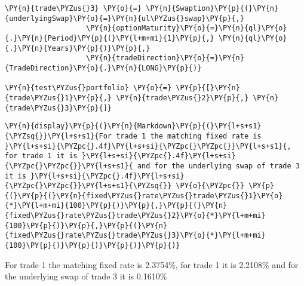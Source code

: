 \begin{tcolorbox}[breakable, size=fbox, boxrule=1pt, pad at break*=1mm,colback=cellbackground, colframe=cellborder]
\begin{Verbatim}[commandchars=\\\{\}]
\PY{n}{trade\PYZus{}3} \PY{o}{=} \PY{n}{Swaption}\PY{p}{(}\PY{n}{underlyingSwap}\PY{o}{=}\PY{n}{ul\PYZus{}swap}\PY{p}{,}
                   \PY{n}{optionMaturity}\PY{o}{=}\PY{n}{ql}\PY{o}{.}\PY{n}{Period}\PY{p}{(}\PY{l+m+mi}{1}\PY{p}{,} \PY{n}{ql}\PY{o}{.}\PY{n}{Years}\PY{p}{)}\PY{p}{,}
                   \PY{n}{tradeDirection}\PY{o}{=}\PY{n}{TradeDirection}\PY{o}{.}\PY{n}{LONG}\PY{p}{)}

\PY{n}{test\PYZus{}portfolio} \PY{o}{=} \PY{p}{[}\PY{n}{trade\PYZus{}1}\PY{p}{,} \PY{n}{trade\PYZus{}2}\PY{p}{,} \PY{n}{trade\PYZus{}3}\PY{p}{]}
\end{Verbatim}
\end{tcolorbox}

    \begin{tcolorbox}[breakable, size=fbox, boxrule=1pt, pad at break*=1mm,colback=cellbackground, colframe=cellborder]
\begin{Verbatim}[commandchars=\\\{\}]
\PY{n}{display}\PY{p}{(}\PY{n}{Markdown}\PY{p}{(}\PY{l+s+s1}{\PYZsq{}}\PY{l+s+s1}{For trade 1 the matching fixed rate is }\PY{l+s+si}{\PYZpc{}.4f}\PY{l+s+si}{\PYZpc{}\PYZpc{}}\PY{l+s+s1}{, for trade 1 it is }\PY{l+s+si}{\PYZpc{}.4f}\PY{l+s+si}{\PYZpc{}\PYZpc{}}\PY{l+s+s1}{ and for the underlying swap of trade 3 it is }\PY{l+s+si}{\PYZpc{}.4f}\PY{l+s+si}{\PYZpc{}\PYZpc{}}\PY{l+s+s1}{\PYZsq{}} \PY{o}{\PYZpc{}} \PY{p}{(}\PY{p}{(}\PY{n}{fixed\PYZus{}rate\PYZus{}trade\PYZus{}1}\PY{o}{*}\PY{l+m+mi}{100}\PY{p}{)}\PY{p}{,}\PY{p}{(}\PY{n}{fixed\PYZus{}rate\PYZus{}trade\PYZus{}2}\PY{o}{*}\PY{l+m+mi}{100}\PY{p}{)}\PY{p}{,}\PY{p}{(}\PY{n}{fixed\PYZus{}rate\PYZus{}trade\PYZus{}3}\PY{o}{*}\PY{l+m+mi}{100}\PY{p}{)}\PY{p}{)}\PY{p}{)}\PY{p}{)}
\end{Verbatim}
\end{tcolorbox}

    For trade 1 the matching fixed rate is 2.3754\%, for trade 1 it is
2.2108\% and for the underlying swap of trade 3 it is 0.1610\%

